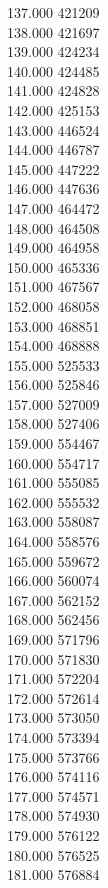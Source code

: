 { 137.000	421209 \\
 138.000	421697 \\
 139.000	424234 \\
 140.000	424485 \\
 141.000	424828 \\
 142.000	425153 \\
 143.000	446524 \\
 144.000	446787 \\
 145.000	447222 \\
 146.000	447636 \\
 147.000	464472 \\
 148.000	464508 \\
 149.000	464958 \\
 150.000	465336 \\
 151.000	467567 \\
 152.000	468058 \\
 153.000	468851 \\
 154.000	468888 \\
 155.000	525533 \\
 156.000	525846 \\
 157.000	527009 \\
 158.000	527406 \\
 159.000	554467 \\
 160.000	554717 \\
 161.000	555085 \\
 162.000	555532 \\
 163.000	558087 \\
 164.000	558576 \\
 165.000	559672 \\
 166.000	560074 \\
 167.000	562152 \\
 168.000	562456 \\
 169.000	571796 \\
 170.000	571830 \\
 171.000	572204 \\
 172.000	572614 \\
 173.000	573050 \\
 174.000	573394 \\
 175.000	573766 \\
 176.000	574116 \\
 177.000	574571 \\
 178.000	574930 \\
 179.000	576122 \\
 180.000	576525 \\
 181.000	576884 \\
}
